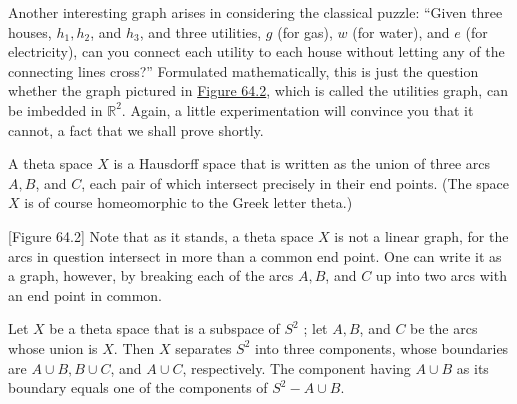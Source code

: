 \begin{centeredblock}
\begin{example}
\label{ex:\thesection.\theexample}
Another interesting graph arises in considering the classical puzzle: ``Given three houses, \(h_{1},h_{2}\), and \(h_{3}\), and three utilities, \(g\) (for gas), \(w\) (for water), and \(e\) (for electricity), can you connect each utility to each house without letting any of the connecting lines cross?'' Formulated mathematically, this is just the question whether the graph pictured in \hyperref[fig:64.2]{Figure 64.2}, which is called the utilities graph, can be imbedded in \(\mathbb{R}^{2}\). Again, a little experimentation will convince you that it cannot, a fact that we shall prove shortly.
\end{example}
\end{centeredblock}

\begin{definition}
A theta space \(X\) is a Hausdorff space that is written as the union of three arcs \(A,B\), and \(C\), each pair of which intersect precisely in their end points. (The space \(X\) is of course homeomorphic to the Greek letter theta.)
\end{definition}

[Figure 64.2]
Note that as it stands, a theta space \(X\) is not a linear graph, for the arcs in question intersect in more than a common end point. One can write it as a graph, however, by breaking each of the arcs \(A,B\), and \(C\) up into two arcs with an end point in common.

\begin{lemma}
\label{lem:\thetheorem}
Let \(X\) be a theta space that is a subspace of \(S^{2}\) ; let \(A,B\), and \(C\) be the arcs whose union is \(X\). Then \(X\) separates \(S^{2}\) into three components, whose boundaries are \(A \cup B,B \cup C\), and \(A \cup C\), respectively. The component having \(A \cup B\) as its boundary equals one of the components of \(S^{2} - A \cup B\).
\end{lemma}


